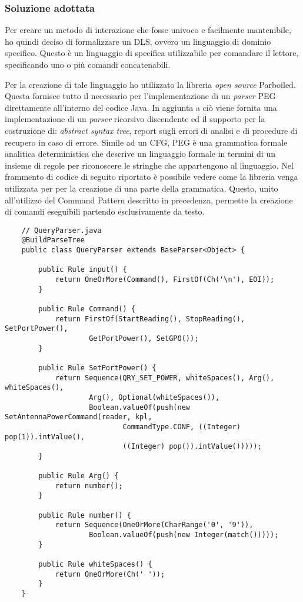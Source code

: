 \subsubsection*{Soluzione adottata}
Per creare un metodo di interazione che fosse univoco e facilmente mantenibile, ho quindi deciso di formalizzare un DLS, ovvero
un linguaggio di dominio specifico. Questo è un linguaggio di specifica utilizzabile per comandare il lettore, specificando uno o più
comandi concatenabili.

Per la creazione di tale linguaggio ho utilizzato la libreria \emph{open source} Parboiled. Questa fornisce tutto il necessario per l'implementazione
di un \emph{parser} PEG direttamente all'interno del codice Java. In aggiunta a ciò viene fornita una implementazione di un \emph{parser} ricorsivo discendente ed il
supporto per la costruzione di: \emph{abstract syntax tree}, report sugli errori di analisi e di procedure di recupero in caso di errore.
Simile ad un CFG, PEG è una grammatica formale analitica deterministica che descrive un linguaggio formale in termini di un insieme di regole per riconoscere
le stringhe che appartengono al linguaggio.
Nel frammento di codice di seguito riportato è possibile vedere come la libreria venga utilizzata per per la creazione di una parte della grammatica.
Questo, unito all'utilizzo del Command Pattern descritto in precedenza, permette la creazione di comandi eseguibili partendo esclusivamente da testo.

\begin{lstlisting}
    // QueryParser.java
    @BuildParseTree
    public class QueryParser extends BaseParser<Object> {
        
        public Rule input() {
		    return OneOrMore(Command(), FirstOf(Ch('\n'), EOI));
	    }

	    public Rule Command() {
		    return FirstOf(StartReading(), StopReading(), SetPortPower(),
		            GetPortPower(), SetGPO());
	    }

        public Rule SetPortPower() {
		    return Sequence(QRY_SET_POWER, whiteSpaces(), Arg(), whiteSpaces(),
		            Arg(), Optional(whiteSpaces()),
		            Boolean.valueOf(push(new SetAntennaPowerCommand(reader, kpl,
		                    CommandType.CONF, ((Integer) pop(1)).intValue(),
		                    ((Integer) pop()).intValue()))));
	    }

        public Rule Arg() {
		    return number();
	    }

	    public Rule number() {
		    return Sequence(OneOrMore(CharRange('0', '9')),
		            Boolean.valueOf(push(new Integer(match()))));
	    }

	    public Rule whiteSpaces() {
		    return OneOrMore(Ch(' '));
	    }
    }
\end{lstlisting}

